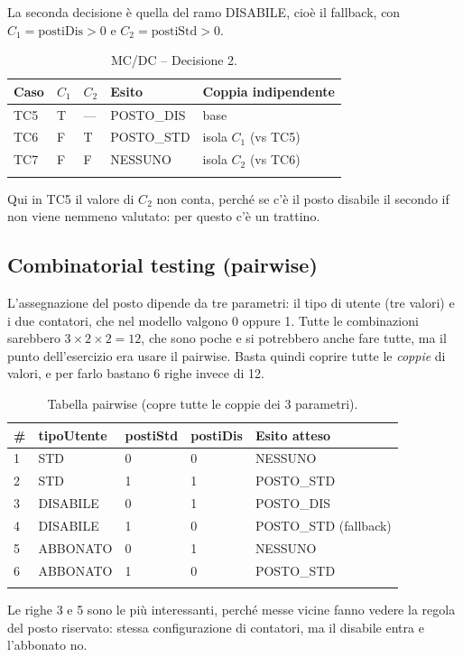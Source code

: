 La seconda decisione è quella del ramo DISABILE, cioè il fallback, con
$C_1{=}\text{postiDis}{>}0$ e $C_2{=}\text{postiStd}{>}0$.

\begin{longtable}{@{}p{1cm}p{1cm}p{1cm}p{2.6cm}p{6.5cm}@{}}
\toprule
Caso & $C_1$ & $C_2$ & Esito & Coppia indipendente \\
\midrule
\endhead
TC5 & T & --- & POSTO\_DIS & base \\
TC6 & F & T & POSTO\_STD & isola $C_1$ (vs TC5) \\
TC7 & F & F & NESSUNO & isola $C_2$ (vs TC6) \\
\bottomrule
\caption{MC/DC -- Decisione 2.}
\label{tab:mcdc2}
\end{longtable}

Qui in TC5 il valore di $C_2$ non conta, perché se c'è il posto disabile il secondo if
non viene nemmeno valutato: per questo c'è un trattino.

\subsection{Combinatorial testing (pairwise)}

L'assegnazione del posto dipende da tre parametri: il tipo di utente (tre valori) e i due
contatori, che nel modello valgono 0 oppure 1. Tutte le combinazioni sarebbero
$3 \times 2 \times 2 = 12$, che sono poche e si potrebbero anche fare tutte, ma il punto
dell'esercizio era usare il pairwise. Basta quindi coprire tutte le \emph{coppie} di
valori, e per farlo bastano 6 righe invece di 12.

\begin{longtable}{@{}p{0.6cm}p{2cm}p{1.6cm}p{1.6cm}p{3.5cm}@{}}
\toprule
\# & tipoUtente & postiStd & postiDis & Esito atteso \\
\midrule
\endhead
1 & STD      & 0 & 0 & NESSUNO \\
2 & STD      & 1 & 1 & POSTO\_STD \\
3 & DISABILE & 0 & 1 & POSTO\_DIS \\
4 & DISABILE & 1 & 0 & POSTO\_STD (fallback) \\
5 & ABBONATO & 0 & 1 & NESSUNO \\
6 & ABBONATO & 1 & 0 & POSTO\_STD \\
\bottomrule
\caption{Tabella pairwise (copre tutte le coppie dei 3 parametri).}
\label{tab:pairwise}
\end{longtable}

Le righe 3 e 5 sono le più interessanti, perché messe vicine fanno vedere la regola del
posto riservato: stessa configurazione di contatori, ma il disabile entra e l'abbonato
no.
\newpage
